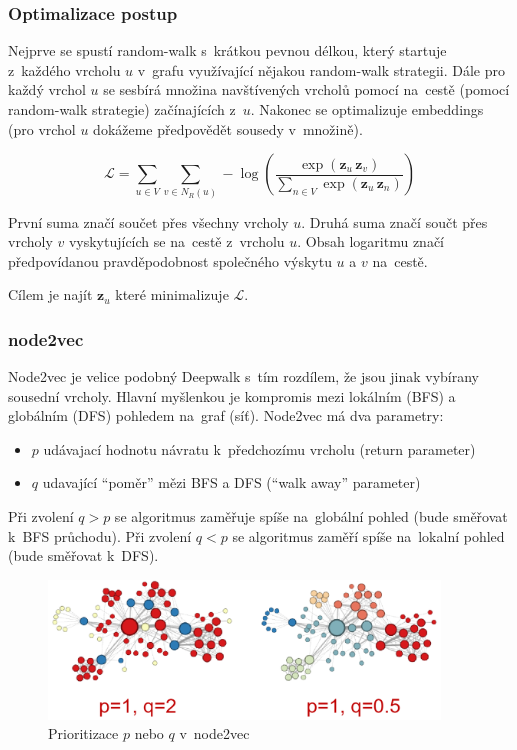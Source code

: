 \subsubsection{Optimalizace postup}

Nejprve se spustí random-walk s~krátkou pevnou délkou, který startuje z~každého vrcholu $u$ v~grafu využívající nějakou random-walk strategii.
Dále pro každý vrchol $u$ se sesbírá množina navštívených vrcholů pomocí na~cestě (pomocí random-walk strategie) začínajících z~$u$.
Nakonec se optimalizuje embeddings (pro vrchol $u$ dokážeme předpovědět sousedy v~množině).

$$\mathcal{L} = \sum_{u\in V} \sum_{v\in N_R (u)} - \log(\frac{\exp(\mathbf{z}_{u}\,\mathbf{z}_{v})}{\sum_{n\in V} \exp(\mathbf{z}_{u}\,\mathbf{z}_{n})})$$

První suma značí součet přes všechny vrcholy $u$.
Druhá suma značí součt přes vrcholy $v$ vyskytujících se na~cestě z~vrcholu $u$.
Obsah logaritmu značí předpovídanou pravděpodobnost společného výskytu $u$ a $v$ na~cestě.

Cílem je najít $\mathbf{z}_u$ které minimalizuje $\mathcal{L}$.


\subsubsection{node2vec}

Node2vec je velice podobný Deepwalk s~tím rozdílem, že jsou jinak vybírany sousední vrcholy.
Hlavní myšlenkou je kompromis mezi lokálním (BFS) a globálním (DFS) pohledem na~graf (síť).
Node2vec má dva parametry:
\begin{itemize}
	\item $p$ udávajací hodnotu návratu k~předchozímu vrcholu (return parameter)
	\item $q$ udavající \enquote{poměr} mězi BFS a DFS (\enquote{walk away} parameter)
\end{itemize}

Při zvolení $q>p$ se algoritmus zaměřuje spíše na~globální pohled (bude směřovat k~BFS průchodu). Při zvolení $q<p$ se algoritmus zaměří spíše na~lokalní pohled (bude směřovat k~DFS).

\begin{figure}[ht]
    \centering
	\includegraphics[height=10em]{images/11_node2vec-pq}
    \caption{Prioritizace $p$ nebo $q$ v~node2vec}
\end{figure}

